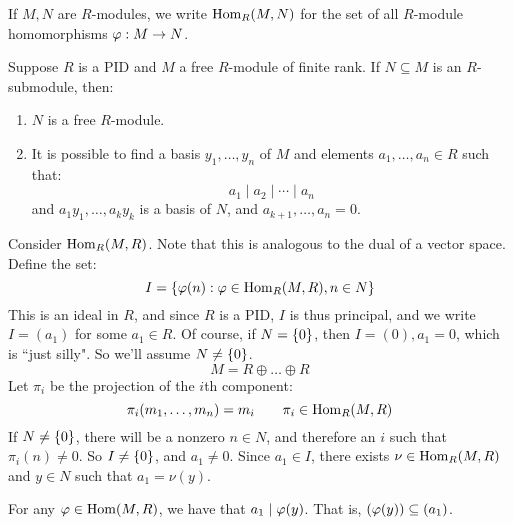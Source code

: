 
If $ M, N $ are $ R $-modules, we write $ \textrm{Hom}_{R}(M, N) $ for the set
of all $ R $-module homomorphisms $ \operatorname{\varphi}: M \rightarrow N $.

\begin{thm}
    Suppose $ R $ is a PID and $ M $ a free $ R $-module of finite rank. \vsp
    If $ N \subseteq M $ is an $ R $-submodule, then:
    \begin{enumerate}
        \item $ N $ is a free $ R $-module.
        \item It is possible to find a basis $ y_{1}, \dots, y_{n} $ of $ M $
            and elements $ a_{1}, \dots, a_{n} \in R $ such that:
            \begin{equation*}
                a_{1} \mid a_{2} \mid \cdots \mid a_{n}
            \end{equation*}
            and $ a_{1}y_{1}, \dots, a_{k}y_{k} $ is a basis of $ N $, and
            $ a_{k+1}, \dots, a_{n} = 0 $.
    \end{enumerate}
\end{thm}

Consider $ \operatorname{Hom}_{R}(M, R) $. Note that this is analogous to the dual of a vector
space. Define the set:
\begin{equation*}
   I = \left\{{\operatorname{\varphi}(n) : \operatorname{\varphi} \in \operatorname{Hom}_{R}(M, R), n \in N}\right\} 
\end{equation*}
This is an ideal in $ R $, and since $ R $ is a PID, $ I $ is thus principal,
and we write $ I = (a_{1}) $ for some $ a_{1} \in R $.
Of course, if $ N = \left\{{0}\right\} $, then $ I = (0), a_{1} = 0 $, which is
``just silly". So we'll assume $ N \neq \left\{{0}\right\} $.
\begin{equation*}
    M = R \oplus \dots \oplus R
\end{equation*}
Let $ \pi_{i} $ be the projection of the $ i $th component:
\begin{equation*}
    \pi_{i}(m_{1}, \dots, m_{n}) = m_{i} \qquad
    \pi_{i} \in \operatorname{Hom}_{R}(M, R)
\end{equation*}
If $ N \neq \left\{{0}\right\} $, there will be a nonzero $ n \in N $, and therefore an
$ i $ such that $ \pi_{i}(n) \neq 0 $. So $ I \neq \left\{{0}\right\} $, and
$ a_{1} \neq 0 $.
Since $ a_{1} \in I $, there exists $ \nu \in \operatorname{Hom}_{R}(M, R) $ and $ y \in N $
such that $ a_{1} = \nu(y) $.

\begin{lm}
    For any $ \operatorname{\varphi} \in \operatorname{Hom}(M, R) $, we have that $ a_{1} \mid \operatorname{\varphi}(y) $.
    That is, $ (\operatorname{\varphi}(y)) \subseteq (a_{1}) $.
\end{lm}

